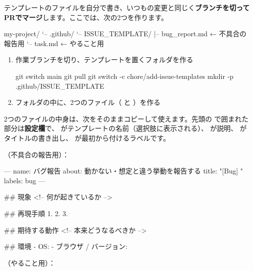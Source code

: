 テンプレートのファイルを自分で書き、いつもの変更と同じく\textbf{ブランチを切ってPRでマージ}します。ここでは、次の2つを作ります。

\begin{codebox}[text]
\begin{code}
my-project/
`-- .github/
    `-- ISSUE_TEMPLATE/
        |-- bug_report.md   ← 不具合の報告用
        `-- task.md         ← やること用
\end{code}
\end{codebox}

\begin{enumerate}[leftmargin=1.6em]
  \item 作業ブランチを切り、テンプレートを置くフォルダを作る
\begin{codebox}[bash]
\begin{code}
git switch main
git pull
git switch -c chore/add-issue-templates
mkdir -p .github/ISSUE_TEMPLATE
\end{code}
\end{codebox}
  \item フォルダの中に、2つのファイル（ と ）を作る
\end{enumerate}

2つのファイルの中身は、次をそのままコピーして使えます。先頭の \cmd{-{}-{}-} で囲まれた部分は\textbf{設定欄}で、 がテンプレートの名前（選択肢に表示される）、 が説明、 がタイトルの書き出し、 が最初から付けるラベルです。

（不具合の報告用）：

\begin{codebox}[markdown]
\begin{code}
---
name: バグ報告
about: 動かない・想定と違う挙動を報告する
title: "[Bug] "
labels: bug
---

## 現象
<!-- 何が起きているか -->

## 再現手順
1.
2.
3.

## 期待する動作
<!-- 本来どうなるべきか -->

## 環境
- OS:
- ブラウザ / バージョン:
\end{code}
\end{codebox}

（やること用）：

\begin{codebox}[markdown]
\end{codebox}

